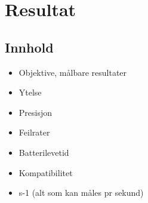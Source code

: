 \chapter{Resultat}
\label{resultat} %
\section{Innhold}
\begin{itemize}
    \item Objektive, målbare resultater
    \item Ytelse
    \item Presisjon
    \item Feilrater
    \item Batterilevetid
    \item Kompatibilitet
    \item s-1 (alt som kan måles pr sekund)
\end{itemize}






